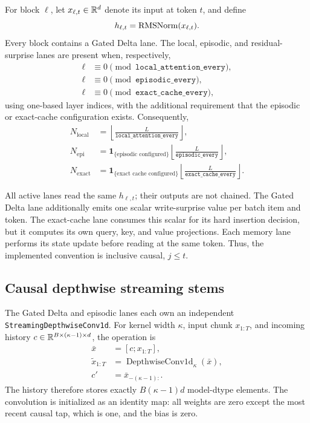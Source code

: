For block \(\ell\), let \(x_{\ell,t}\in\mathbb{R}^d\) denote its input at token
\(t\), and define
\begin{equation}
  h_{\ell,t}=\operatorname{RMSNorm}(x_{\ell,t}).
  \label{eq:block-normalized-input}
\end{equation}
Every block contains a Gated Delta lane.  The local, episodic, and
residual-surprise lanes are present when, respectively,
\begin{align}
  \ell &\equiv 0
  \pmod{\texttt{local\_attention\_every}}, \\
  \ell &\equiv 0
  \pmod{\texttt{episodic\_every}}, \\
  \ell &\equiv 0
  \pmod{\texttt{exact\_cache\_every}},
\end{align}
using one-based layer indices, with the additional requirement that the
episodic or exact-cache configuration exists.  Consequently,
\begin{align}
  N_{\mathrm{local}}
    &=\left\lfloor
        \frac{L}{\texttt{local\_attention\_every}}
      \right\rfloor, \\
  N_{\mathrm{epi}}
    &=\mathbf{1}_{\{\text{episodic configured}\}}
      \left\lfloor
        \frac{L}{\texttt{episodic\_every}}
      \right\rfloor, \\
  N_{\mathrm{exact}}
    &=\mathbf{1}_{\{\text{exact cache configured}\}}
      \left\lfloor
        \frac{L}{\texttt{exact\_cache\_every}}
      \right\rfloor .
  \label{eq:scheduled-lane-counts}
\end{align}

All active lanes read the same \(h_{\ell,t}\); their outputs are not chained.
The Gated Delta lane additionally emits one scalar write-surprise value per
batch item and token.  The exact-cache lane consumes this scalar for its hard
insertion decision, but it computes its own query, key, and value projections.
Each memory lane performs its state update before reading at the same token.
Thus, the implemented convention is inclusive causal, \(j\leq t\).

\subsection{Causal depthwise streaming stems}
\label{subsec:streaming-stem}

The Gated Delta and episodic lanes each own an independent
\texttt{StreamingDepthwiseConv1d}.  For kernel width \(\kappa\), input chunk
\(x_{1:T}\), and incoming history \(c\in\mathbb{R}^{B\times(\kappa-1)\times d}\),
the operation is
\begin{align}
  \bar x &= [c;x_{1:T}], \\
  \widetilde x_{1:T}
    &=\operatorname{DepthwiseConv1d}_{\kappa}(\bar x), \\
  c'&=\bar x_{-(\kappa-1):}.
  \label{eq:streaming-convolution}
\end{align}
The history therefore stores exactly \(B(\kappa-1)d\) model-dtype elements.
The convolution is initialized as an identity map: all weights are zero
except the most recent causal tap, which is one, and the bias is zero.

